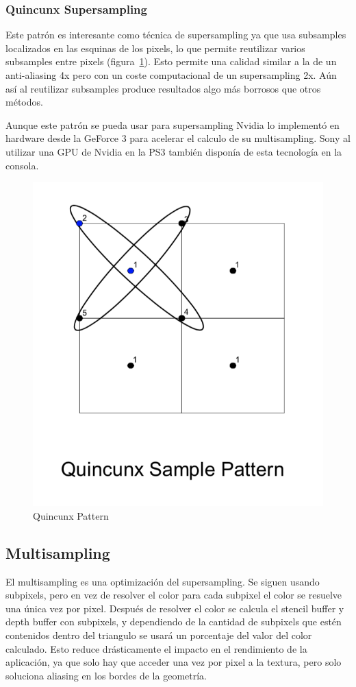 \documentclass[withindex, glossary]{cam-thesis}
\begin{document}
\subsubsection{Quincunx Supersampling}

Este patrón es interesante como técnica de supersampling ya que usa subsamples localizados en las esquinas de los pixels, lo que permite reutilizar varios subsamples entre pixels (figura~\ref{fig:quincunx}). Esto permite una calidad similar a la de un anti-aliasing 4x pero con un coste computacional de un supersampling 2x. Aún así al reutilizar subsamples produce resultados algo más borrosos que otros métodos.

Aunque este patrón se pueda usar para supersampling Nvidia lo implementó en hardware desde la GeForce 3\cite{hraa} para acelerar el calculo de su multisampling. Sony al utilizar una GPU de Nvidia en la PS3 también disponía de esta tecnología en la consola.

\begin{figure}[!htbp]
    \includegraphics[width=.5\linewidth]{figures/quincunx.png}
    \caption{Quincunx Pattern\cite{hraa}\label{fig:quincunx}}
\end{figure}

\subsection{Multisampling}

El multisampling es una optimización del supersampling. Se siguen usando subpixels, pero en vez de resolver el color para cada subpixel el color se resuelve una única vez por pixel. Después de resolver el color se calcula el stencil buffer y depth buffer con subpixels, y dependiendo de la cantidad de subpixels que estén contenidos dentro del triangulo se usará un porcentaje del valor del color calculado. Esto reduce drásticamente el impacto en el rendimiento de la aplicación, ya que solo hay que acceder una vez por pixel a la textura, pero solo soluciona aliasing en los bordes de la geometría\cite{nvidiamsaa}\cite{msaa}.
\end{document}
